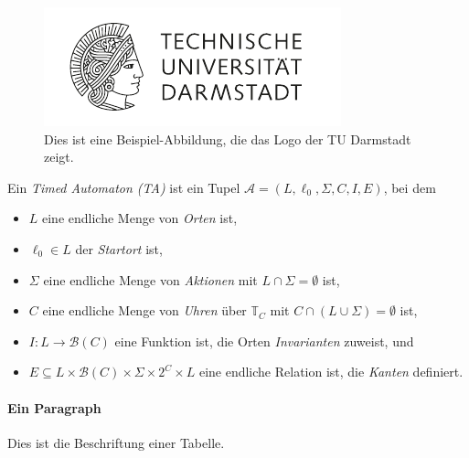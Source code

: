 \begin{figure}
    \centering
    \includegraphics[width=.3\linewidth]{figures/sample-figure.pdf}
    \caption{Dies ist eine Beispiel-Abbildung, die das Logo der TU Darmstadt zeigt.}\label{fig:some-figure}
\end{figure}


\begin{definition}\label{def:dummy-def}
Ein \emph{Timed Automaton (TA)} ist ein Tupel $\mathcal{A}=(L,\ell_0,\Sigma,C,I,E)$, bei dem
\begin{itemize}
	\item $L$ eine endliche Menge von \emph{Orten} ist,
	\item $\ell_0\in L$ der \emph{Startort} ist,
	\item $\Sigma$ eine endliche Menge von \emph{Aktionen} mit $L\cap\Sigma=\emptyset$ ist,
	\item $C$ eine endliche Menge von \emph{Uhren} über $\mathbb{T}_C$ mit $C\cap(L\cup\Sigma)=\emptyset$ ist,
	\item $I:L\rightarrow\mathcal{B}(C)$ eine Funktion ist, die Orten \emph{Invarianten} zuweist, und
	\item $E\subseteq L\times\mathcal{B}(C)\times\Sigma\times 2^{C}\times L$ eine endliche Relation ist, die \emph{Kanten} definiert.
\end{itemize}
\end{definition}


\paragraph{Ein Paragraph}
\lipsum[9]

\begin{example}\label{example:dummy-example}
\lipsum[5-6]
\end{example}

\begin{table}[tp]
    \centering
    \caption{Dies ist die Beschriftung einer Tabelle.}\label{table:some-table}
    
\end{table}


